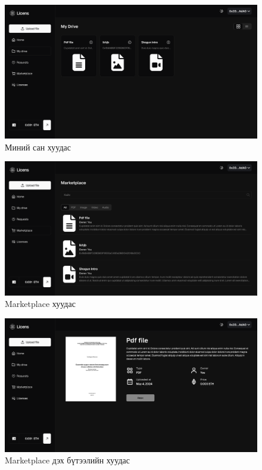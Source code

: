 \begin{figure}[h!]
	\centering
	\includegraphics[scale=0.16]{src/images/drive.png}
	\caption{Миний сан хуудас}
\end{figure}

\begin{figure}[h!]
	\centering
	\includegraphics[scale=0.16]{src/images/marketplace.png}
	\caption{Marketplace хуудас}
\end{figure}

\begin{figure}[h!]
	\centering
	\includegraphics[scale=0.16]{src/images/marketplace-file.png}
	\caption{Marketplace дэх бүтээлийн хуудас}
\end{figure}

